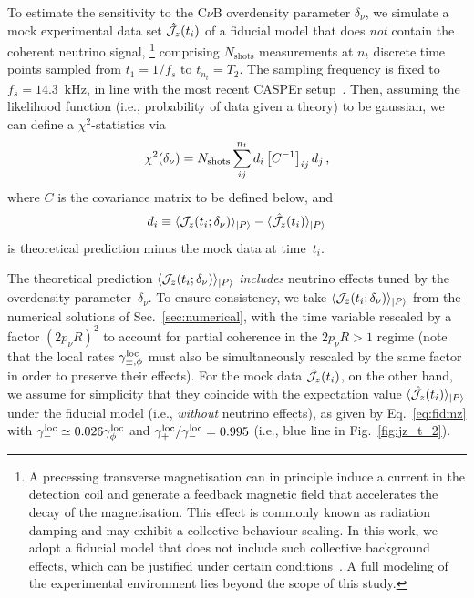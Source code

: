 \documentclass[aps,prd,10pt,twocolumn,superscriptaddress,floatfix,nofootinbib,amsmath,amssymb,altaffilletter,preprintnumbers]{revtex4-1}
\begin{document}
To estimate the sensitivity to the C$\nu$B overdensity parameter $\delta_\nu$, we 
 simulate a mock experimental data set ${\cal \hat{J}}_z(t_i)$ of a fiducial model that does {\it not} contain the coherent neutrino signal,%
%
\footnote{A precessing transverse magnetisation can in principle induce a current in the detection coil and generate a feedback magnetic field that accelerates the decay of the magnetisation.  This effect is commonly known as radiation damping and may exhibit a collective behaviour scaling.  In this work, we adopt a fiducial model that does not include such collective background effects, which can be justified under certain conditions~\cite{Galanis:2025amc}. A full modeling of the experimental environment lies beyond the scope of this study.}
%
comprising $N_{\text{shots}}$ measurements at $n_t$ discrete time points sampled from $t_1 = 1/f_s$ to $t_{n_t} = T_2$. The sampling frequency is fixed to $f_s = 14.3$~kHz, in line with the most recent CASPEr setup~\cite{Walter:2025ldb}.  
Then, assuming the likelihood function (i.e., probability of data given a theory) to be gaussian, we can define a $\chi^2$-statistics via
\begin{equation}
\chi^2  (\delta_\nu)= N_{\rm shots} \sum_{ij}^{n_t} d_i \left[C^{-1} \right]_{ij} d_j\, ,
\label{eq:chi2}
\end{equation}
where $C$ is the covariance matrix to be defined below, and 
\begin{equation}
d_i \equiv     \langle {\cal J}_z(t_i; \delta_{\nu})\rangle_{|P\rangle} -\langle {\cal \hat{J}}_z(t_i)\rangle_{|P \rangle}
\end{equation}
is theoretical prediction minus the mock data at time~$t_i$.  

The theoretical prediction  $\langle {\cal J}_z(t_i; \delta_{\nu})\rangle_{|P\rangle}$ {\it includes} neutrino effects tuned by the overdensity parameter~$\delta_\nu$. To ensure consistency, we take $\langle {\cal J}_z(t_i; \delta_{\nu}) \rangle_{|P\rangle}$ from the numerical solutions of Sec.~\ref{sec:numerical}, with the time variable rescaled by a factor $(2 p_\nu R)^{2}$  to account for partial coherence in the  $2 p_\nu R > 1$ regime (note that the local rates $\gamma_{\pm,\phi}^{\rm loc}$ must also be simultaneously rescaled by the same factor in order to preserve their effects). 
For the mock data ${\cal \hat{J}}_z(t_i)$, on the other hand, we assume for simplicity that they coincide with the expectation value $\langle {\cal \hat{J}}_z(t_i) \rangle_{|P \rangle}$ 
under the fiducial model (i.e., {\it without} neutrino effects), 
as given by Eq.~\eqref{eq:fidmz} with $\gamma_-^{\rm loc} \simeq 0.026 \gamma_\phi^{\rm loc}$
and $\gamma_+^{\rm loc}/\gamma_-^{\rm loc}=0.995$ (i.e., blue line in Fig.~\ref{fig:jz_t_2}).
\end{document}
